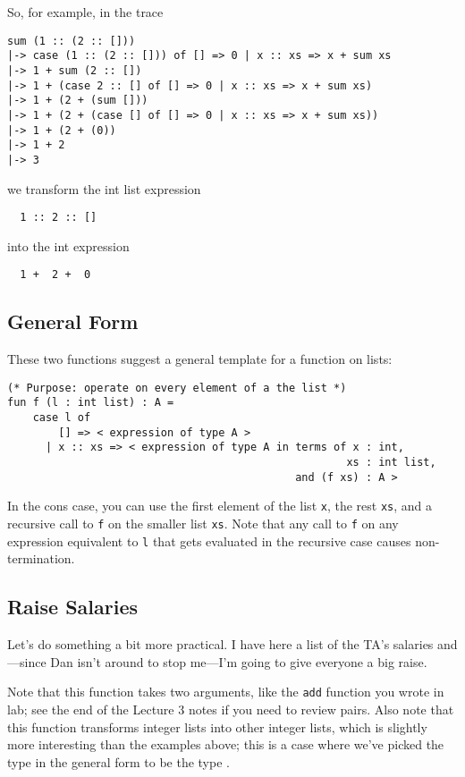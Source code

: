 \documentclass[11pt]{article}
\begin{document}
So, for example, in the trace
\begin{verbatim}
sum (1 :: (2 :: []))
|-> case (1 :: (2 :: [])) of [] => 0 | x :: xs => x + sum xs
|-> 1 + sum (2 :: [])
|-> 1 + (case 2 :: [] of [] => 0 | x :: xs => x + sum xs)
|-> 1 + (2 + (sum []))
|-> 1 + (2 + (case [] of [] => 0 | x :: xs => x + sum xs))
|-> 1 + (2 + (0))
|-> 1 + 2
|-> 3
\end{verbatim}
we transform the int list expression
\begin{verbatim}
  1 :: 2 :: []
\end{verbatim}
into the int expression
\begin{verbatim}
  1 +  2 +  0
\end{verbatim}

\subsection{General Form}
These two functions suggest a general template for a function on lists:
\begin{framed}
\begin{verbatim}
(* Purpose: operate on every element of a the list *)
fun f (l : int list) : A =
    case l of
        [] => < expression of type A >
      | x :: xs => < expression of type A in terms of x : int,
                                                     xs : int list,
                                             and (f xs) : A >
\end{verbatim} 
\end{framed}
In the cons case, you can use the first element of the list \verb|x|, the
rest \verb|xs|, and a recursive call to \verb|f| on the smaller list
\verb|xs|. Note that any call to \verb|f| on any expression equivalent to
\verb|l| that gets evaluated in the recursive case causes
non-termination.

\subsection{Raise Salaries}
Let's do something a bit more practical. I have here a list of the TA's
salaries and---since Dan isn't around to stop me---I'm going to give everyone
a big raise.



Note that this function takes two arguments, like the \verb|add| function
you wrote in lab; see the end of the Lecture 3 notes if you need to review
pairs. Also note that this function transforms integer lists into other
integer lists, which is slightly more interesting than the examples above;
this is a case where we've picked the type  in the general form to
be the type .
\end{document}
